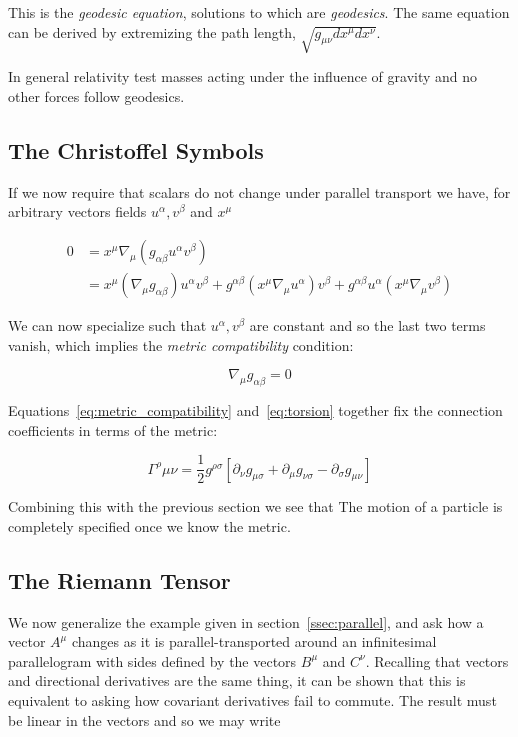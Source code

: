 This is the \emph{geodesic equation}, solutions to which are
\emph{geodesics}.  The same equation can be derived by extremizing
the path length, $\sqrt{g_{\mu\nu} dx^\mu dx^\nu}$.

In general relativity test masses acting under the influence of
gravity and no other forces follow geodesics.  

\subsection{The Christoffel Symbols}

If we now require that scalars do not change under parallel transport
we have, for arbitrary vectors fields $u^\alpha, v^\beta$ and $x^\mu$

\begin{align*}
0 &= x^\mu \nabla_\mu (g_{\alpha\beta} u^\alpha v^\beta) \\
&= x^\mu (\nabla_\mu g_{\alpha\beta}) u^\alpha v^\beta
+ g^{\alpha\beta} (x^\mu \nabla_\mu u^\alpha) v^\beta
+ g^{\alpha\beta} u^\alpha (x^\mu \nabla_\mu v^\beta)
\end{align*}

We can now specialize such that $u^\alpha, v^\beta$ are constant
and so the last two terms vanish, which implies the  \emph{metric
compatibility} condition:

\begin{equation}
\label{eq:metric_compatibility}
\nabla_\mu g_{\alpha\beta} = 0
\end{equation}

Equations~\ref{eq:metric_compatibility} and~\ref{eq:torsion} together
fix the connection coefficients in terms of the metric:

\begin{equation}
\Gamma^{\rho}{\mu\nu}
= \frac{1}{2} g^{\rho\sigma}\left[
\partial_\nu g_{\mu\sigma}
+ \partial_\mu g_{\nu\sigma}
- \partial_\sigma g_{\mu\nu}
\right]
\end{equation}


Combining this with the previous section we see that The motion of a
particle is completely specified once we know the metric.

\subsection{The Riemann Tensor}

We now generalize the example given in section~\ref{ssec:parallel}, and
ask how a vector $A^\mu$ changes as it is parallel-transported around
an infinitesimal parallelogram with sides defined by the vectors
$B^\mu$ and $C^\nu$.  Recalling that vectors and directional
derivatives are the same thing, it can be shown that this is
equivalent to asking how covariant derivatives fail to commute.  The
result must be linear in the vectors and so we may write

